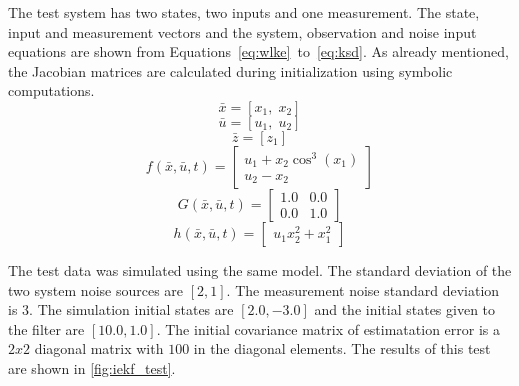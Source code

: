 The test system has two states, two inputs and one measurement. The state, input and measurement vectors and the system, observation and noise input equations are shown from Equations~\ref{eq:wlke}~to~\ref{eq:ksd}. As already mentioned, the Jacobian matrices are calculated during initialization using symbolic computations.\\ 

\begin{equation}
    \bar x = \left [ x_{1}, \; x_{2}\right ]
    \label{eq:wlke}
\end{equation}
\begin{equation}
    \bar u = \left [ u_{1}, \; u_{2}\right ]
\end{equation}
\begin{equation}
    \bar z = \left [ z_{1} \right]
\end{equation}
\begin{equation}
    f\left(\bar x, \bar u, t \right ) = 
    \left[\begin{matrix}u_{1} + x_{2} \cos^{3}{\left (x_{1} \right )}\\u_{2} - x_{2}\end{matrix}\right]
\end{equation}
\begin{equation}
    G\left(\bar x, \bar u, t \right ) = 
    \left[\begin{matrix}1.0 & 0.0\\0.0 & 1.0\end{matrix}\right]
\end{equation}
\begin{equation}
    h\left(\bar x, \bar u, t \right ) = 
    \left[\begin{matrix}u_{1} x_{2}^{2} + x_{1}^{2}\end{matrix}\right]
    \label{eq:ksd}
\end{equation}

The test data was simulated using the same model. The standard deviation of the two system noise sources are $[2, 1]$. The measurement noise standard deviation is $3$. The simulation initial states are $[2.0, -3.0]$ and the initial states given to the filter are $[10.0, 1.0]$. The initial covariance matrix of estimatation error is a $2x2$ diagonal matrix with $100$ in the diagonal elements. The results of this test are shown in \autoref{fig:iekf_test}.

